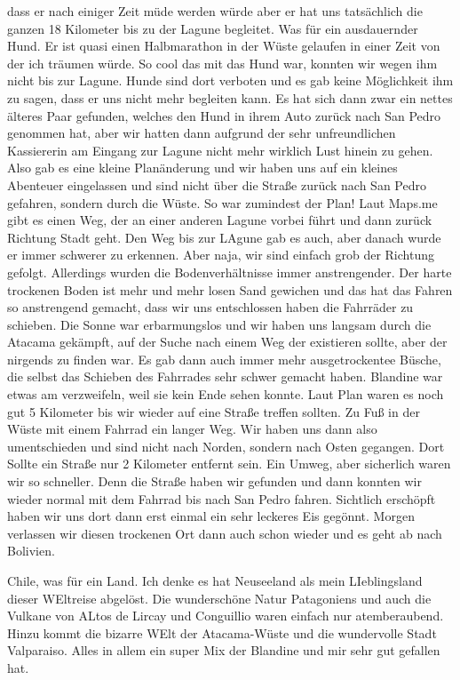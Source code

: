 \documentclass[11pt]{book}
\begin{document}
dass er nach einiger Zeit müde werden würde aber er hat uns tatsächlich die ganzen 18 Kilometer bis zu der Lagune begleitet. Was für ein ausdauernder Hund. 
Er ist quasi einen Halbmarathon in der Wüste gelaufen in einer Zeit von der ich träumen würde. So cool das mit das Hund war, konnten wir wegen ihm nicht 
bis zur Lagune. Hunde sind dort verboten und es gab keine Möglichkeit ihm zu sagen, dass er uns nicht mehr begleiten kann. Es hat sich dann zwar ein 
nettes älteres Paar gefunden, welches den Hund in ihrem Auto zurück nach San Pedro genommen hat, aber wir hatten dann aufgrund der sehr unfreundlichen 
Kassiererin am Eingang zur Lagune nicht mehr wirklich Lust hinein zu gehen. Also gab es eine kleine Planänderung und wir haben uns auf ein kleines Abenteuer 
eingelassen und sind nicht über die Straße zurück nach San Pedro gefahren, sondern durch die Wüste. So war zumindest der Plan! Laut Maps.me gibt es einen 
Weg, der an einer anderen Lagune vorbei führt und dann zurück Richtung Stadt geht. Den Weg bis zur LAgune gab es auch, aber danach wurde er immer schwerer 
zu erkennen. Aber naja, wir sind einfach grob der Richtung gefolgt. Allerdings wurden die Bodenverhältnisse immer anstrengender. Der harte trockenen 
Boden ist mehr und mehr losen Sand gewichen und das hat das Fahren so anstrengend gemacht, dass wir uns entschlossen haben die Fahrräder zu schieben. 
Die Sonne war erbarmungslos und wir haben uns langsam durch die Atacama gekämpft, auf der Suche nach einem Weg der existieren sollte, aber der nirgends 
zu finden war. Es gab dann auch immer mehr ausgetrockentee Büsche, die selbst das Schieben des Fahrrades sehr schwer gemacht haben. Blandine war 
etwas am verzweifeln, weil sie kein Ende sehen konnte. Laut Plan waren es noch gut 5 Kilometer bis wir wieder auf eine Straße treffen sollten. Zu Fuß in der 
Wüste mit einem Fahrrad ein langer Weg. Wir haben uns dann also umentschieden und sind nicht nach Norden, sondern nach Osten gegangen. Dort Sollte ein 
Straße nur 2 Kilometer entfernt sein. Ein Umweg, aber sicherlich waren wir so schneller. Denn die Straße haben wir gefunden und dann konnten wir wieder normal 
mit dem Fahrrad bis nach San Pedro fahren. Sichtlich erschöpft haben wir uns dort dann erst einmal ein sehr leckeres Eis gegönnt. 
Morgen verlassen wir diesen trockenen Ort dann auch schon wieder und es geht ab nach Bolivien. 


Chile, was für ein Land. Ich denke es hat Neuseeland als mein LIeblingsland dieser WEltreise abgelöst. Die wunderschöne Natur Patagoniens und auch die 
Vulkane von ALtos de Lircay und Conguillio waren einfach nur atemberaubend. Hinzu kommt die bizarre WElt der Atacama-Wüste und die wundervolle Stadt 
Valparaiso. Alles in allem ein super Mix der Blandine und mir sehr gut gefallen hat. 
\end{document}
